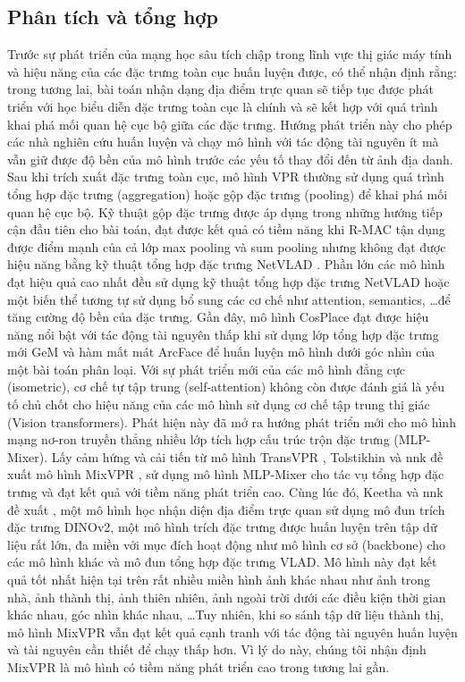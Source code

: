 \subsection{Phân tích và tổng hợp}

Trước sự phát triển của mạng học sâu tích chập trong lĩnh vực thị giác máy tính và hiệu năng của các đặc trưng toàn cục huấn luyện được, có thể nhận định rằng: trong tương lai, bài toán nhận dạng địa điểm trực quan sẽ tiếp tục được phát triển với học biểu diễn đặc trưng toàn cục là chính và sẽ kết hợp với quá trình khai phá mối quan hệ cục bộ giữa các đặc trưng. Hướng phát triển này cho phép các nhà nghiên cứu huấn luyện và chạy mô hình với tác động tài nguyên ít mà vẫn giữ được độ bền của mô hình trước các yếu tố thay đổi đến từ ảnh địa danh. Sau khi trích xuất đặc trưng toàn cục, mô hình VPR thường sử dụng quá trình tổng hợp đặc trưng (aggregation) hoặc gộp đặc trưng (pooling) để khai phá mối quan hệ cục bộ. Kỹ thuật gộp đặc trưng được áp dụng trong những hướng tiếp cận đầu tiên cho bài toán, đạt được kết quả có tiềm năng khi R-MAC \cite{imageSearchKernel} tận dụng được điểm mạnh của cả lớp max pooling và sum pooling nhưng không đạt được hiệu năng bằng kỹ thuật tổng hợp đặc trưng NetVLAD \cite{arandjelovic2016netvlad}. Phần lớn các mô hình đạt hiệu quả cao nhất đều sử dụng kỹ thuật tổng hợp đặc trưng NetVLAD hoặc một biến thể tương tự sử dụng bổ sung các cơ chế như attention, semantics, \dots để tăng cường độ bền của đặc trưng. Gần đây, mô hình CosPlace \cite{berton2022rethinking} đạt được hiệu năng nổi bật với tác động tài nguyên thấp khi sử dụng lớp tổng hợp đặc trưng mới GeM \cite{GeM} và hàm mất mát ArcFace \cite{Deng_2022} để huấn luyện mô hình dưới góc nhìn của một bài toán phân loại. Với sự phát triển mới của các mô hình đẳng cực (isometric), cơ chế tự tập trung (self-attention) không còn được đánh giá là yếu tố chủ chốt cho hiệu năng của các mô hình sử dụng cơ chế tập trung thị giác (Vision transformers). Phát hiện này đã mở ra hướng phát triển mới cho mô hình mạng nơ-ron truyền thẳng nhiều lớp tích hợp cấu trúc trộn đặc trưng (MLP-Mixer). Lấy cảm hứng và cải tiến từ mô hình TransVPR \cite{wang2022transvpr}, Tolstikhin và nnk đề xuất mô hình MixVPR \cite{alibey2023mixvpr}, sử dụng mô hình MLP-Mixer cho tác vụ tổng hợp đặc trưng và đạt kết quả với tiềm năng phát triển cao. Cùng lúc đó, Keetha và nnk đề xuất \cite{keetha2023anyloc}, một mô hình học nhận diện địa điểm trực quan sử dụng mô đun trích đặc trưng DINOv2, một mô hình trích đặc trưng được huấn luyện trên tập dữ liệu rất lớn, đa miền với mục đích hoạt động như mô hình cơ sở (backbone) cho các mô hình khác và mô đun tổng hợp đặc trưng VLAD. Mô hình này đạt kết quả tốt nhất hiện tại trên rất nhiều miền hình ảnh khác nhau như ảnh trong nhà, ảnh thành thị, ảnh thiên nhiên, ảnh ngoài trời dưới các điều kiện thời gian khác nhau, góc nhìn khác nhau, \dots Tuy nhiên, khi so sánh tập dữ liệu thành thị, mô hình MixVPR vẫn đạt kết quả cạnh tranh với tác động tài nguyên huấn luyện và tài nguyên cần thiết để chạy thấp hơn. Vì lý do này, chúng tôi nhận định MixVPR là mô hình có tiềm năng phát triển cao trong tương lai gần.
